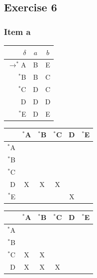 \documentclass[docid=TP07]{tcom_TP}
\begin{document}
{\subsection{Exercise 6}
\subsubsection{Item a}
\begin{center} \begin{tabular}{r | c c}
	$\delta$ & $a$ & $b$ \\ \hline
	$\rightarrow^*$A  & B  & E  \\
	$^*$B  & B  & C  \\
	$^*$C  & D  & C  \\
	D      & D  & D  \\
	$^*$E  & D  & E  
\end{tabular} \end{center}
\begin{center} \begin{tabular}{r || c | c | c | c | c}
	       & $^*$A  & $^*$B  & $^*$C & D  & $^*$E  \\ \hline \hline
	$^*$A  & \cellcolor{gray} & \cellcolor{gray} & \cellcolor{gray} & \cellcolor{gray} & \cellcolor{gray} \\ \hline
	$^*$B  &    & \cellcolor{gray} & \cellcolor{gray} & \cellcolor{gray} & \cellcolor{gray} \\ \hline
	$^*$C  &    &    & \cellcolor{gray} & \cellcolor{gray} & \cellcolor{gray} \\ \hline
	D      & X  & X  & X  & \cellcolor{gray} & \cellcolor{gray} \\ \hline
	$^*$E  &    &    &    & X  & \cellcolor{gray}
\end{tabular} \end{center}
\begin{center} \begin{tabular}{r || c | c | c | c | c}
	       & $^*$A  & $^*$B  & $^*$C & D  & $^*$E  \\ \hline \hline
	$^*$A  & \cellcolor{gray} & \cellcolor{gray} & \cellcolor{gray} & \cellcolor{gray} & \cellcolor{gray} \\ \hline
	$^*$B  &    & \cellcolor{gray} & \cellcolor{gray} & \cellcolor{gray} & \cellcolor{gray} \\ \hline
	$^*$C  & X  & X  & \cellcolor{gray} & \cellcolor{gray} & \cellcolor{gray} \\ \hline
	D      & X  & X  & X  & \cellcolor{gray} & \cellcolor{gray} \\ \hline

\end{tabular}
\end{center}}
\end{document}
